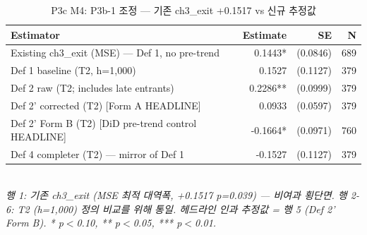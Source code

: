 \begin{table}[t]
\centering
\caption{P3c M4: P3b-1 조정 — 기존 ch3\_exit +0.1517 vs 신규 추정값}
\label{tab:ch5_reconciliation_ko}
\begin{tabular}{p{6.5cm}rrr}
\toprule
Estimator & Estimate & SE & N \\
\midrule
Existing ch3\_exit (MSE) — Def 1, no pre-trend & 0.1443* & (0.0846) & 689 \\
Def 1 baseline (T2, h=1,000) & 0.1527 & (0.1127) & 379 \\
Def 2 raw (T2; includes late entrants) & 0.2286** & (0.0999) & 379 \\
Def 2' corrected (T2) [Form A HEADLINE] & 0.0933 & (0.0597) & 379 \\
Def 2' Form B (T2) [DiD pre-trend control HEADLINE] & -0.1664* & (0.0971) & 760 \\
Def 4 completer (T2) — mirror of Def 1 & -0.1527 & (0.1127) & 379 \\
\bottomrule
\end{tabular}\\
\footnotesize\textit{행 1: 기존 ch3\_exit (MSE 최적 대역폭, +0.1517 p=0.039) — 비여과 횡단면. 행 2-6: T2 (h=1,000) 정의 비교를 위해 통일. 헤드라인 인과 추정값 = 행 5 (Def 2' Form B). * p$<$0.10, ** p$<$0.05, *** p$<$0.01.}
\end{table}

